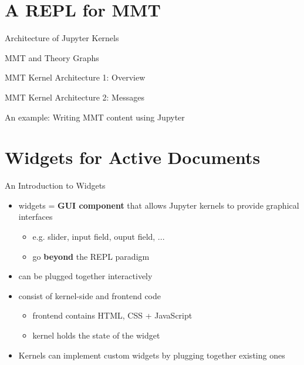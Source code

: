 \documentclass{beamer}
\begin{document}
    \section{A REPL for MMT}

    \begin{frame}{Architecture of Jupyter Kernels}
    \end{frame}

    \begin{frame}{MMT and Theory Graphs}
    \end{frame}

    \begin{frame}{MMT Kernel Architecture 1: Overview}
    \end{frame}

    \begin{frame}{MMT Kernel Architecture 2: Messages}
    \end{frame}

    \begin{frame}{An example: Writing MMT content using Jupyter}
    \end{frame}

    \section{Widgets for Active Documents}

    \begin{frame}{An Introduction to Widgets}
        \begin{itemize}
            \item widgets = \textbf{GUI component} that allows Jupyter kernels to provide graphical interfaces
            \begin{itemize}
                \item e.g. slider, input field, ouput field, ...
                \item go \textbf{beyond} the REPL paradigm
            \end{itemize}

            \item can be plugged together interactively
            \item consist of kernel-side and frontend code
            \begin{itemize}
                \item frontend contains HTML, CSS + JavaScript
                \item kernel holds the state of the widget
            \end{itemize}
            \item Kernels can implement custom widgets by plugging together existing ones
        \end{itemize}
    \end{frame}
\end{document}
